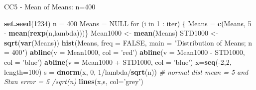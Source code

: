 \documentclass[]{article}
\newenvironment{Shaded}{\begin{snugshade}}{\end{snugshade}}
\newcommand{\KeywordTok}[1]{\textcolor[rgb]{0.13,0.29,0.53}{\textbf{{#1}}}}
\newcommand{\DataTypeTok}[1]{\textcolor[rgb]{0.13,0.29,0.53}{{#1}}}
\newcommand{\DecValTok}[1]{\textcolor[rgb]{0.00,0.00,0.81}{{#1}}}
\newcommand{\StringTok}[1]{\textcolor[rgb]{0.31,0.60,0.02}{{#1}}}
\newcommand{\CommentTok}[1]{\textcolor[rgb]{0.56,0.35,0.01}{\textit{{#1}}}}
\newcommand{\OtherTok}[1]{\textcolor[rgb]{0.56,0.35,0.01}{{#1}}}
\newcommand{\NormalTok}[1]{{#1}}
\begin{document}
CC5 - Mean of Means: n=400

\begin{Shaded}
\begin{Highlighting}[]
\KeywordTok{set.seed}\NormalTok{(}\DecValTok{1234}\NormalTok{)}
\NormalTok{n =}\StringTok{ }\DecValTok{400}
\NormalTok{Means =}\StringTok{ }\OtherTok{NULL}
\NormalTok{for (i in }\DecValTok{1} \NormalTok{:}\StringTok{ }\NormalTok{iter) \{}
    \NormalTok{Means =}\StringTok{ }\KeywordTok{c}\NormalTok{(Means, }\DecValTok{5} \NormalTok{-}\StringTok{ }\KeywordTok{mean}\NormalTok{(}\KeywordTok{rexp}\NormalTok{(n,lambda)))\}}
\NormalTok{Mean1000 <-}\StringTok{ }\KeywordTok{mean}\NormalTok{(Means)}
\NormalTok{STD1000 <-}\StringTok{ }\KeywordTok{sqrt}\NormalTok{(}\KeywordTok{var}\NormalTok{(Means))}
\KeywordTok{hist}\NormalTok{(Means, }\DataTypeTok{freq =} \OtherTok{FALSE}\NormalTok{, }\DataTypeTok{main =} \StringTok{"Distribution of Means; n = 400"}\NormalTok{)}
\KeywordTok{abline}\NormalTok{(}\DataTypeTok{v =} \NormalTok{Mean1000, }\DataTypeTok{col =} \StringTok{'red'}\NormalTok{)}
\KeywordTok{abline}\NormalTok{(}\DataTypeTok{v =} \NormalTok{Mean1000 -}\StringTok{ }\NormalTok{STD1000, }\DataTypeTok{col =} \StringTok{'blue'}\NormalTok{)}
\KeywordTok{abline}\NormalTok{(}\DataTypeTok{v =} \NormalTok{Mean1000 +}\StringTok{ }\NormalTok{STD1000, }\DataTypeTok{col =} \StringTok{'blue'}\NormalTok{)}
\NormalTok{x=}\KeywordTok{seq}\NormalTok{(-}\DecValTok{2}\NormalTok{,}\DecValTok{2}\NormalTok{, }\DataTypeTok{length=}\DecValTok{100}\NormalTok{) }
\NormalTok{s =}\StringTok{ }\KeywordTok{dnorm}\NormalTok{(x, }\DecValTok{0}\NormalTok{, }\DecValTok{1}\NormalTok{/lambda/}\KeywordTok{sqrt}\NormalTok{(n)) }\CommentTok{# normal dist mean = 5 and Stan error = 5 /sqrt(n)  }
\KeywordTok{lines}\NormalTok{(x,s, }\DataTypeTok{col=}\StringTok{'grey'}\NormalTok{)}
\end{Highlighting}
\end{Shaded}
\end{document}
